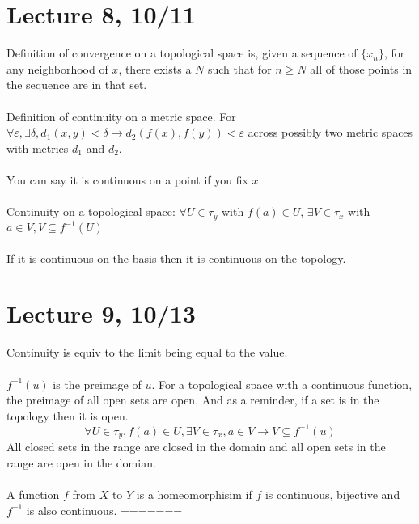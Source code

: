 \documentclass[12pt]{article}
\begin{document}
\section{Lecture 8, 10/11}
Definition of convergence on a topological space is, given a sequence of $\{x_n\}$, for any neighborhood of $x$, there exists a $N$ such that for $n \geq N$ all of those points in the sequence are in that set. \\\\
Definition of continuity on a metric space. For $\forall \varepsilon, \exists \delta, d_1(x,y) < \delta \longrightarrow d_2(f(x),f(y)) < \varepsilon$ across possibly two metric spaces with metrics $d_1$ and $d_2$.\\\\
You can say it is continuous on a point if you fix $x$. \\\\
Continuity on a topological space: $\forall U \in \tau_y$ with $f(a) \in U$, $\exists V \in \tau_x$ with $a \in V, V \subseteq f^{-1}(U)$\\\\
If it is continuous on the basis then it is continuous on the topology. 

\newpage
\section{Lecture 9, 10/13}
Continuity is equiv to the limit being equal to the value. \\\\
$f^{-1}(u)$ is the preimage of $u$. For a topological space with a continuous function, the preimage of all open sets are open. And as a reminder, if a set is in the topology then it is open. 
$$\forall U \in \tau_y, f(a) \in U, \exists V \in \tau_x, a \in V \longrightarrow V \subseteq f^{-1}(u)$$
All closed sets in the range are closed in the domain and all open sets in the range are open in the domian. \\\\
A function $f$ from $X$ to $Y$ is a homeomorphisim if $f$ is continuous, bijective and $f^{-1}$ is also continuous.
=======
\end{document}
